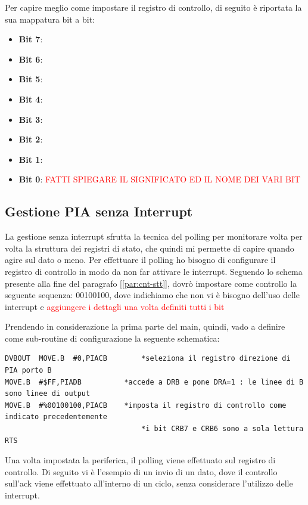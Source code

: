Per capire meglio come impostare il registro di controllo, di seguito è riportata la sua mappatura bit a bit:
\begin{itemize}
    \item \textbf{Bit 7}:
    \item \textbf{Bit 6}:
    \item \textbf{Bit 5}:
    \item \textbf{Bit 4}:
    \item \textbf{Bit 3}:
    \item \textbf{Bit 2}:
    \item \textbf{Bit 1}:
    \item \textbf{Bit 0}: \textcolor{red}{FATTI SPIEGARE IL SIGNIFICATO ED IL NOME DEI VARI BIT}
\end{itemize}

\subsection{Gestione PIA senza Interrupt}\label{par:PIA-INT}
La gestione senza interrupt sfrutta la tecnica del polling per monitorare volta per volta la struttura dei registri di stato, che quindi mi permette di capire quando agire sul dato o meno. Per effettuare il polling ho bisogno di configurare il registro di controllo in modo da non far attivare le interrupt.
Seguendo lo schema presente alla fine del paragrafo [\ref{par:cnt-stt}], dovrò impostare come controllo la seguente sequenza: 00100100, dove indichiamo che non vi è bisogno dell'uso delle interrupt e \textcolor{red}{aggiungere i dettagli una volta definiti tutti i bit}

Prendendo in considerazione la prima parte del main, quindi, vado a definire come sub-routine di configurazione la seguente schematica:
\begin{lstlisting}
DVBOUT	MOVE.B	#0,PIACB		*seleziona il registro direzione di PIA porto B 
MOVE.B	#$FF,PIADB	  		*accede a DRB e pone DRA=1 : le linee di B sono linee di output	
MOVE.B	#%00100100,PIACB   	*imposta il registro di controllo come indicato precedentemente
								*i bit CRB7 e CRB6 sono a sola lettura	
RTS
\end{lstlisting}

Una volta impostata la periferica, il polling viene effettuato sul registro di controllo. Di seguito vi è l'esempio di un invio di un dato, dove il controllo sull'ack viene effettuato all'interno di un ciclo, senza considerare l'utilizzo delle interrupt.


